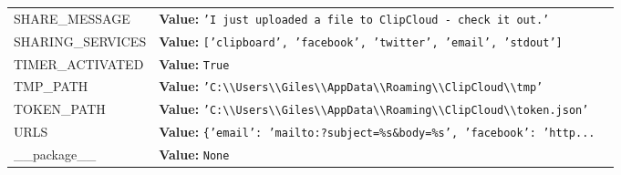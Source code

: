 \begin{longtable}{|p{\varnamewidth}|p{\vardescrwidth}|l}
\cline{1-2}
\raggedright S\-H\-A\-R\-E\-\_\-M\-E\-S\-S\-A\-G\-E\- & \raggedright \textbf{Value:} 
{\tt \texttt{'}\texttt{I just uploaded a file to ClipCloud - check it out.}\texttt{'}}&\\
\cline{1-2}
\raggedright S\-H\-A\-R\-I\-N\-G\-\_\-S\-E\-R\-V\-I\-C\-E\-S\- & \raggedright \textbf{Value:} 
{\tt \texttt{[}\texttt{'}\texttt{clipboard}\texttt{'}\texttt{, }\texttt{'}\texttt{facebook}\texttt{'}\texttt{, }\texttt{'}\texttt{twitter}\texttt{'}\texttt{, }\texttt{'}\texttt{email}\texttt{'}\texttt{, }\texttt{'}\texttt{stdout}\texttt{'}\texttt{]}}&\\
\cline{1-2}
\raggedright T\-I\-M\-E\-R\-\_\-A\-C\-T\-I\-V\-A\-T\-E\-D\- & \raggedright \textbf{Value:} 
{\tt True}&\\
\cline{1-2}
\raggedright T\-M\-P\-\_\-P\-A\-T\-H\- & \raggedright \textbf{Value:} 
{\tt \texttt{'}\texttt{C:{\textbackslash}{\textbackslash}Users{\textbackslash}{\textbackslash}Giles{\textbackslash}{\textbackslash}AppData{\textbackslash}{\textbackslash}Roaming{\textbackslash}{\textbackslash}ClipCloud{\textbackslash}{\textbackslash}tmp}\texttt{'}}&\\
\cline{1-2}
\raggedright T\-O\-K\-E\-N\-\_\-P\-A\-T\-H\- & \raggedright \textbf{Value:} 
{\tt \texttt{'}\texttt{C:{\textbackslash}{\textbackslash}Users{\textbackslash}{\textbackslash}Giles{\textbackslash}{\textbackslash}AppData{\textbackslash}{\textbackslash}Roaming{\textbackslash}{\textbackslash}ClipCloud{\textbackslash}{\textbackslash}token.json}\texttt{'}}&\\
\cline{1-2}
\raggedright U\-R\-L\-S\- & \raggedright \textbf{Value:} 
{\tt \texttt{\{}\texttt{'}\texttt{email}\texttt{'}\texttt{: }\texttt{'}\texttt{mailto:?subject=\%s\&body=\%s}\texttt{'}\texttt{, }\texttt{'}\texttt{facebook}\texttt{'}\texttt{: }\texttt{'}\texttt{http}\texttt{...}}&\\
\cline{1-2}
\raggedright \_\-\_\-p\-a\-c\-k\-a\-g\-e\-\_\-\_\- & \raggedright \textbf{Value:} 
{\tt None}&\\
\cline{1-2}
\end{longtable}

